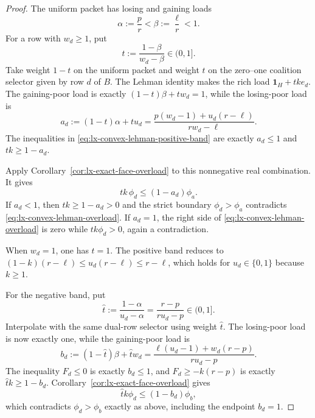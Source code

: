\begin{proof}
The uniform packet has losing and gaining loads
\[
 \alpha:=\frac{p}{r}<\beta:=\frac{\ell}{r}<1.
\]
For a row with $w_d\geq1$, put
\[
 t:=\frac{1-\beta}{w_d-\beta}\in(0,1].
\]
Take weight $1-t$ on the uniform packet and weight $t$ on the zero--one
coalition selector given by row $d$ of $B$.  The Lehman identity makes the
rich load $\mathbf1_H+tk e_d$.  The gaining-poor load is exactly
$(1-t)\beta+t w_d=1$, while the losing-poor load is
\[
 a_d:=(1-t)\alpha+t u_d
 =\frac{p(w_d-1)+u_d(r-\ell)}{rw_d-\ell}.           \tag{LH-C1}
 \label{eq:lx-convex-lehman-losing-load}
\]
The inequalities in \eqref{eq:lx-convex-lehman-positive-band} are exactly
$a_d\leq1$ and $tk\geq1-a_d$.

Apply Corollary~\ref{cor:lx-exact-face-overload} to this nonnegative real
combination.  It gives
\[
 tk\,\phi_d\leq(1-a_d)\phi_a.                       \tag{LH-C2}
 \label{eq:lx-convex-lehman-overload}
\]
If $a_d<1$, then $tk\geq1-a_d>0$ and the strict boundary
$\phi_d>\phi_a$ contradicts \eqref{eq:lx-convex-lehman-overload}.  If
$a_d=1$, the right side of \eqref{eq:lx-convex-lehman-overload} is zero
while $tk\phi_d>0$, again a contradiction.

When $w_d=1$, one has $t=1$.  The positive band reduces to
$(1-k)(r-\ell)\leq u_d(r-\ell)\leq r-\ell$, which holds for
$u_d\in\{0,1\}$ because $k\geq1$.

For the negative band, put
\[
 \widehat t:=\frac{1-\alpha}{u_d-\alpha}
 =\frac{r-p}{ru_d-p}\in(0,1].
\]
Interpolate with the same dual-row selector using weight $\widehat t$.
The losing-poor load is now exactly one, while the gaining-poor load is
\[
 b_d:=(1-\widehat t)\beta+\widehat t w_d
 =\frac{\ell(u_d-1)+w_d(r-p)}{ru_d-p}.              \tag{LH-C3}
 \label{eq:lx-convex-lehman-gaining-load}
\]
The inequality $F_d\leq0$ is exactly $b_d\leq1$, and
$F_d\geq-k(r-p)$ is exactly $\widehat t k\geq1-b_d$.
Corollary~\ref{cor:lx-exact-face-overload} gives
\[
 \widehat t k\phi_d\leq(1-b_d)\phi_b,             \tag{LH-C4}
 \label{eq:lx-convex-lehman-negative-overload}
\]
which contradicts $\phi_d>\phi_b$ exactly as above, including the endpoint
$b_d=1$.


\end{proof}
